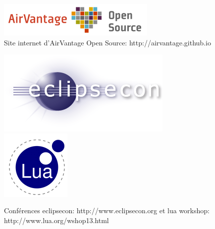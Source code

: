 \documentclass{article}
\begin{document}
\begin{figure}[h!]
    \centering\includegraphics[width=\linewidth/3]{img/airvantage_love_os_logo.png}
    \caption{Site internet d’AirVantage Open Source: http://airvantage.github.io}
\end{figure}
\begin{figure}[h!]
    \centering
    \includegraphics[width=\linewidth/3]{img/eclipsecon.png}
    \includegraphics[width=\linewidth/5]{img/lua.png}
    \caption{Conférences eclipsecon: http://www.eclipsecon.org et lua workshop: http://www.lua.org/wshop13.html}
\end{figure}
\end{document}
